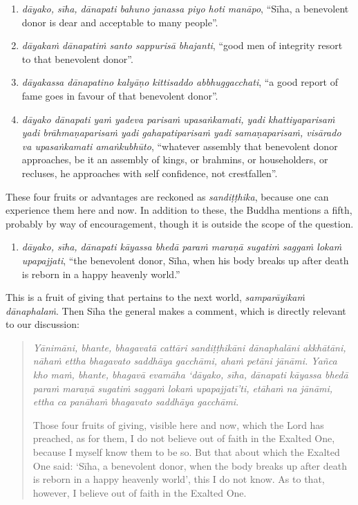 \begin{enumerate}
\def\labelenumi{\arabic{enumi}.}
\tightlist
\item
  \emph{dāyako, sīha, dānapati bahuno janassa piyo hoti manāpo}, ``Sīha, a benevolent donor is dear and acceptable to many people''.
\item
  \emph{dāyakaṁ dānapatiṁ santo sappurisā bhajanti}, ``good men of integrity resort to that benevolent donor''.
\item
  \emph{dāyakassa dānapatino kalyāṇo kittisaddo abbhuggacchati}, ``a good report of fame goes in favour of that benevolent donor''.
\item
  \emph{dāyako dānapati yaṁ yadeva parisaṁ upasaṅkamati, yadi khattiyaparisaṁ yadi brāhmaṇaparisaṁ yadi gahapatiparisaṁ yadi samaṇaparisaṁ, visārado va upasaṅkamati amaṅkubhūto}, ``whatever assembly that benevolent donor approaches, be it an assembly of kings, or brahmins, or householders, or recluses, he approaches with self confidence, not crestfallen''.
\end{enumerate}

These four fruits or advantages are reckoned as \emph{sandiṭṭhika}, because one can experience them here and now. In addition to these, the Buddha mentions a fifth, probably by way of encouragement, though it is outside the scope of the question.

\begin{enumerate}
\def\labelenumi{\arabic{enumi}.}
\setcounter{enumi}{4}
\tightlist
\item
  \emph{dāyako, sīha, dānapati kāyassa bhedā paraṁ maraṇā sugatiṁ saggaṁ lokaṁ upapajjati}, ``the benevolent donor, Sīha, when his body breaks up after death is reborn in a happy heavenly world.''
\end{enumerate}

This is a fruit of giving that pertains to the next world, \emph{samparāyikaṁ dānaphalaṁ}. Then Sīha the general makes a comment, which is directly relevant to our discussion:

\begin{quote}
\emph{Yānimāni, bhante, bhagavatā cattāri sandiṭṭhikāni dānaphalāni akkhātāni, nāhaṁ ettha bhagavato saddhāya gacchāmi, ahaṁ petāni jānāmi. Yañca kho maṁ, bhante, bhagavā evamāha `dāyako, sīha, dānapati kāyassa bhedā paraṁ maraṇā sugatiṁ saggaṁ lokaṁ upapajjatī'ti, etāhaṁ na jānāmi, ettha ca panāhaṁ bhagavato saddhāya gacchāmi}.

Those four fruits of giving, visible here and now, which the Lord has preached, as for them, I do not believe out of faith in the Exalted One, because I myself know them to be so. But that about which the Exalted One said: `Sīha, a benevolent donor, when the body breaks up after death is reborn in a happy heavenly world', this I do not know. As to that, however, I believe out of faith in the Exalted One.
\end{quote}

